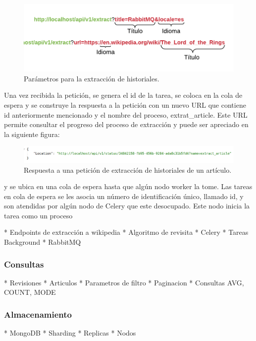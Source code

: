 \begin{figure}[H]
	\centering
		\includegraphics[width=1\textwidth]{figures/extract_url_format}
	\caption{Parámetros para la extracción de historiales.}
	\label{fig:extract_url_format}
\end{figure}

Una vez recibida la petición, se genera el id de la tarea, se coloca en la cola de espera y se construye la respuesta a la petición
con un nuevo URL que contiene id anteriormente mencionado y el nombre del proceso, extrat_article. Este URL permite consultar el progreso del proceso de extracción y puede ser apreciado en la siguiente figura:

\begin{figure}[H]
	\centering
		\includegraphics[width=1\textwidth]{figures/extract_response}
	\caption{Respuesta a una petición de extracción de historiales de un artículo.}
	\label{fig:extract_response}
\end{figure}

 y se ubica en una cola de espera hasta que algún nodo worker la tome. Las tareas en cola de espera se les asocia un número de identificación único, 
llamado id, y son atendidas por algún nodo de Celery que este desocupado. Este nodo inicia la tarea como un proceso  


* Endpoints de extracción a wikipedia
* Algoritmo de revisita
* Celery
* Tareas Background
* RabbitMQ

\subsubsection{Consultas}

* Revisiones
* Articulos
* Parametros de filtro
* Paginacion
* Consultas AVG, COUNT, MODE

\subsubsection{Almacenamiento}

* MongoDB
* Sharding
* Replicas
* Nodos